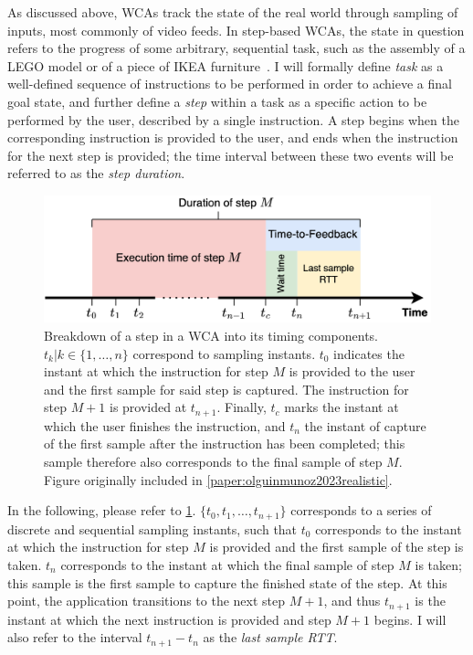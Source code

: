 As discussed above, \glspl{WCA} track the state of the real world through sampling of inputs, most commonly of video feeds.
In step-based \glspl{WCA}, the state in question refers to the progress of some arbitrary, sequential task, such as the assembly of a LEGO model or of a piece of IKEA furniture~\cite{chen2018application}.
I will formally define \emph{task} as a well-defined sequence of instructions to be performed in order to achieve a final goal state, and further define a \emph{step} within a task as a specific action to be performed by the user, described by a single instruction.
A step begins when the corresponding instruction is provided to the user, and ends when the instruction for the next step is provided;
the time interval between these two events will be referred to as the \emph{step duration}.

\begin{figure}
    \centering
    \includegraphics[width=.9\textwidth]{publications/2023EdgeDroid2/figs/step_time}
    \caption[]{%
        Breakdown of a step in a \gls{WCA} into its timing components.
        \ensuremath{t_k | k \in \{1, \ldots, n \}} correspond to sampling instants.
        \ensuremath{t_0} indicates the instant at which the instruction for step \ensuremath{M} is provided to the user and the first sample for said step is captured.
        The instruction for step \ensuremath{M + 1} is provided at \ensuremath{t_{n+1}}.
        Finally, \ensuremath{t_c} marks the instant at which the user finishes the instruction, and \ensuremath{t_n} the instant of capture of the first sample after the instruction has been completed;
        this sample therefore also corresponds to the final sample of step \ensuremath{M}.
        Figure originally included in \cref{paper:olguinmunoz2023realistic}.
    }\label{fig:wcastep}
\end{figure}

In the following, please refer to \cref{fig:wcastep}.
\ensuremath{\{ t_0, t_1, \ldots, t_{n + 1} \}} corresponds to a series of discrete and sequential sampling instants, such that \ensuremath{t_0} corresponds to the instant at which the instruction for step \ensuremath{M} is provided and the first sample of the step is taken.
\ensuremath{t_n} corresponds to the instant at which the final sample of step \ensuremath{M} is taken;
this sample is the first sample to capture the finished state of the step.
At this point, the application transitions to the next step \ensuremath{M + 1}, and thus \ensuremath{t_{n + 1}} is the instant at which the next instruction is provided and step \ensuremath{M + 1} begins.
I will also refer to the interval \ensuremath{t_{n + 1} - t_n} as the \emph{last sample \gls{RTT}}.

